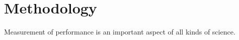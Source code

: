 \chapter{Methodology}
\label{chap:p_measurement}

 Measurement of performance is an important aspect of all kinds of science. 



















